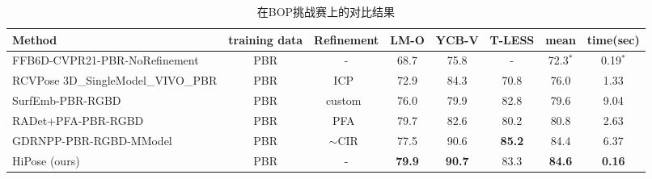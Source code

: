 \begin{sidewaystable}
  \centering
  \begin{tabular}{l|c|c|c|c|c|c|c}
    \toprule
     \textbf{Method} & training data & Refinement & LM-O & YCB-V & T-LESS & mean & time(sec) \\
    \midrule
    FFB6D-CVPR21-PBR-NoRefinement\cite{he2021ffb6d} & PBR &  - & 68.7 &  75.8  & - & 72.3$^*$ & 0.19$^*$\\
    RCVPose 3D\_SingleModel\_VIVO\_PBR\cite{wu2022vote} & PBR &  ICP~\cite{Rusinkiewicz2001EfficientVO} & 72.9 &  84.3  & 70.8 & 76.0 & 1.33\\
    SurfEmb-PBR-RGBD\cite{haugaard2022surfemb} & PBR &  custom~\cite{Haugaard2021SurfEmbDA} & 76.0 &  79.9  & 82.8 & 79.6 & 9.04\\
    RADet+PFA-PBR-RGBD\cite{Hai2023RigidityAwareDF} & PBR &  PFA~\cite{hu2022perspective} & 79.7 &  82.6  & 80.2 & 80.8 & 2.63\\
    GDRNPP-PBR-RGBD-MModel\cite{liu2022gdrnpp_bop} & PBR &  $\sim$CIR~\cite{lipson2022coupled} & 77.5 &  90.6  & \textbf{85.2} & 84.4 & 6.37\\
    HiPose (ours) & PBR &  - & \textbf{79.9} &  \textbf{90.7}   & 83.3 & \textbf{84.6} & \textbf{0.16}\\
    \bottomrule
  \end{tabular}
  \caption{在BOP挑战赛上的对比结果}
  \label{tab:bop_score_table}
\end{sidewaystable}



